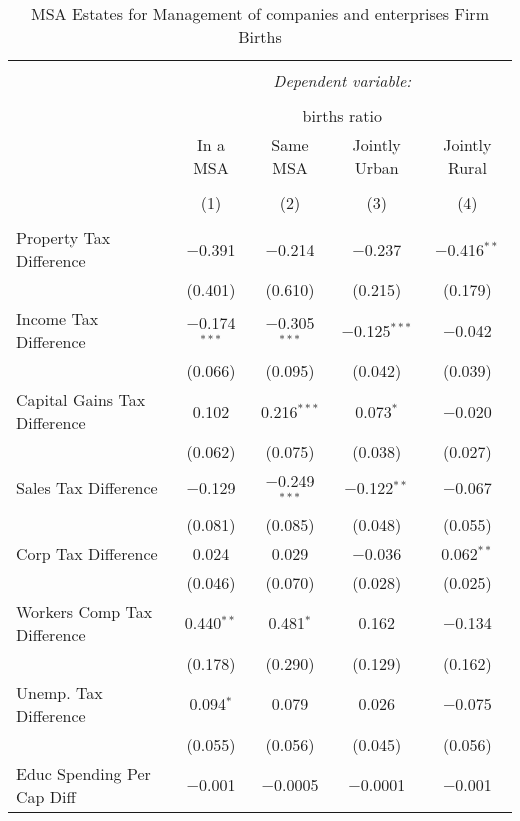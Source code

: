 
\begin{table}[!htbp] \centering 
  \caption{MSA Estates for  Management of companies and enterprises Firm Births} 
  \label{55metro} 
\begin{tabular}{@{\extracolsep{5pt}}lcccc} 
\\[-1.8ex]\hline 
\hline \\[-1.8ex] 
 & \multicolumn{4}{c}{\textit{Dependent variable:}} \\ 
\cline{2-5} 
\\[-1.8ex] & \multicolumn{4}{c}{births ratio} \\ 
 & In a MSA & Same MSA & Jointly Urban & Jointly Rural \\ 
\\[-1.8ex] & (1) & (2) & (3) & (4)\\ 
\hline \\[-1.8ex] 
 Property Tax Difference & $-$0.391 & $-$0.214 & $-$0.237 & $-$0.416$^{**}$ \\ 
  & (0.401) & (0.610) & (0.215) & (0.179) \\ 
  Income Tax Difference & $-$0.174$^{***}$ & $-$0.305$^{***}$ & $-$0.125$^{***}$ & $-$0.042 \\ 
  & (0.066) & (0.095) & (0.042) & (0.039) \\ 
  Capital Gains Tax Difference & 0.102 & 0.216$^{***}$ & 0.073$^{*}$ & $-$0.020 \\ 
  & (0.062) & (0.075) & (0.038) & (0.027) \\ 
  Sales Tax Difference & $-$0.129 & $-$0.249$^{***}$ & $-$0.122$^{**}$ & $-$0.067 \\ 
  & (0.081) & (0.085) & (0.048) & (0.055) \\ 
  Corp Tax Difference & 0.024 & 0.029 & $-$0.036 & 0.062$^{**}$ \\ 
  & (0.046) & (0.070) & (0.028) & (0.025) \\ 
  Workers Comp Tax Difference & 0.440$^{**}$ & 0.481$^{*}$ & 0.162 & $-$0.134 \\ 
  & (0.178) & (0.290) & (0.129) & (0.162) \\ 
  Unemp. Tax Difference & 0.094$^{*}$ & 0.079 & 0.026 & $-$0.075 \\ 
  & (0.055) & (0.056) & (0.045) & (0.056) \\ 
  Educ Spending Per Cap Diff & $-$0.001 & $-$0.0005 & $-$0.0001 & $-$0.001 \\ 

\end{tabular}
\end{table}
